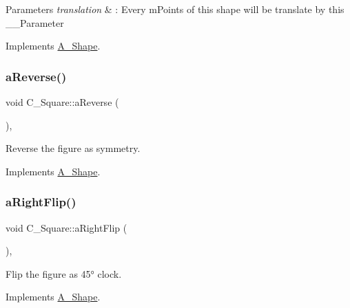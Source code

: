 \begin{DoxyParams}{Parameters}
{\em translation} & \+: Every m\+Points of this shape will be translate by this \+\_\+\+\_\+\+Parameter \\
\hline
\end{DoxyParams}


Implements \hyperlink{classA__Shape_ab284298db1b557ccfa7ba6de7a5fee2c}{A\+\_\+\+Shape}.

\mbox{\label{classC__Square_a961d1f5c49a45459668744d459863bd2}} 
\subsubsection{\texorpdfstring{a\+Reverse()}{aReverse()}}
{\footnotesize\ttfamily void C\+\_\+\+Square\+::a\+Reverse (\begin{DoxyParamCaption}{ }\end{DoxyParamCaption})\hspace{0.3cm}{\ttfamily [override]}, {\ttfamily [virtual]}}



Reverse the figure as symmetry. 



Implements \hyperlink{classA__Shape_afe2c7969d647f6358da13879a7534ecb}{A\+\_\+\+Shape}.

\mbox{\label{classC__Square_a0ea2df0d283ee4ffa911163e55a0a637}} 
\subsubsection{\texorpdfstring{a\+Right\+Flip()}{aRightFlip()}}
{\footnotesize\ttfamily void C\+\_\+\+Square\+::a\+Right\+Flip (\begin{DoxyParamCaption}{ }\end{DoxyParamCaption})\hspace{0.3cm}{\ttfamily [override]}, {\ttfamily [virtual]}}



Flip the figure as 45° clock. 



Implements \hyperlink{classA__Shape_a892688cbbad3297e00e87cce0dbfc76d}{A\+\_\+\+Shape}.

